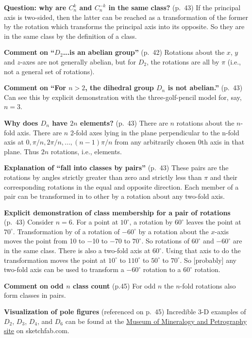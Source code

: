 {\bf Question: why are $C^k_n$ and $C^{-k}_n$ in the same class?}
(p.\ 43) If the principal axis is two-sided, then the latter can be
reached as a transformation of the former by the rotation which
transforms the principal axis into its opposite. So they are in the
same class by the definition of a class.

{\bf Comment on ``$D_2$...is an abelian group''} (p.\ 42) Rotations
about the $x$, $y$ and $z$-axes are not generally abelian, but for
$D_2$, the rotations are all by $\pi$ (i.e., not a general set of
rotations).
  
{\bf Comment on ``For $n > 2$, the dihedral group $D_n$ is not
  abelian.''} (p.\ 43) Can see this by explicit demonstration with the
three-golf-pencil model for, say, $n=3$.

{\bf Why does $D_n$ have $2n$ elements?} (p.\ 43) There are $n$ rotations
about the $n$-fold axis. There are $n$ 2-fold axes lying in the plane
perpendicular to the n-fold axis at $0,\pi/n,2\pi/n,...,(n-1)\pi/n$
from any arbitrarily chosen 0th axis in that plane. Thus $2n$
rotations, i.e., elements.

{\bf Explanation of ``fall into classes by pairs''} (p.\ 43) These pairs
are the rotations by angles strictly greater than zero and strictly
less than $\pi$ and their corresponding rotations in the equal and
opposite direction. Each member of a pair can be transformed in to
other by a rotation about any two-fold axis.

{\bf Explicit demonstration of class membership for a pair of
  rotations} (p.\ 43) Consider $n=6$. For a point at $10^\circ$, a
rotation by $60^\circ$ leaves the point at $70^\circ$. Transformation
by of a rotation of $-60^\circ$ by a rotation about the $x$-axis moves
the point from 10 to $-$10 to $-$70 to $70^\circ$. So rotations of
$60^\circ$ and $-60^\circ$ are in the same class. There is also a
two-fold axis at $60^\circ$. Using that axis to do the transformation
moves the point at $10^\circ$ to $110^\circ$ to $50^\circ$ to
$70^\circ$. So [probably] any two-fold axis can be used to transform a
$-60^\circ$ rotation to a $60^\circ$ rotation.

{\bf Comment on odd $n$ class count} (p.45) For odd $n$ the $n$-fold
rotations also form classes in pairs.

{\bf Visualization of pole figures} (referenced on p.\ 45) Incredible
3-D examples of $D_2$, $D_3$, $D_4$, and $D_6$ can be found at the
\href{https://sketchfab.com/MineralogyPetrographyMuseum/collections/32-crystal-classes-point-groups-7fdf60cb8df6494e9bb4b5f0dd8ced1b}{Museum
  of Mineralogy and Petrography site} on sketchfab.com.

